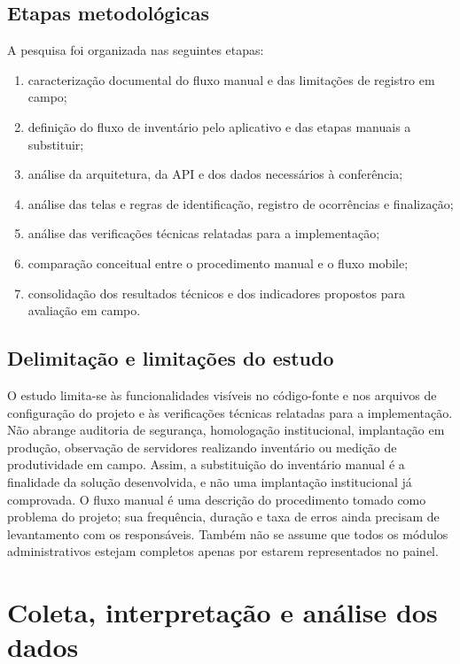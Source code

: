 \documentclass[12pt,a4paper]{article}
\begin{document}
\subsection{Etapas metodológicas}

A pesquisa foi organizada nas seguintes etapas:

\begin{enumerate}
    \item caracterização documental do fluxo manual e das limitações de registro em campo;
    \item definição do fluxo de inventário pelo aplicativo e das etapas manuais a substituir;
    \item análise da arquitetura, da API e dos dados necessários à conferência;
    \item análise das telas e regras de identificação, registro de ocorrências e finalização;
    \item análise das verificações técnicas relatadas para a implementação;
    \item comparação conceitual entre o procedimento manual e o fluxo mobile;
    \item consolidação dos resultados técnicos e dos indicadores propostos para avaliação em campo.
\end{enumerate}

\subsection{Delimitação e limitações do estudo}

O estudo limita-se às funcionalidades visíveis no código-fonte e nos arquivos de configuração do projeto e às verificações técnicas relatadas para a implementação. Não abrange auditoria de segurança, homologação institucional, implantação em produção, observação de servidores realizando inventário ou medição de produtividade em campo. Assim, a substituição do inventário manual é a finalidade da solução desenvolvida, e não uma implantação institucional já comprovada. O fluxo manual é uma descrição do procedimento tomado como problema do projeto; sua frequência, duração e taxa de erros ainda precisam de levantamento com os responsáveis. Também não se assume que todos os módulos administrativos estejam completos apenas por estarem representados no painel.

\section{Coleta, interpretação e análise dos dados}
\end{document}
